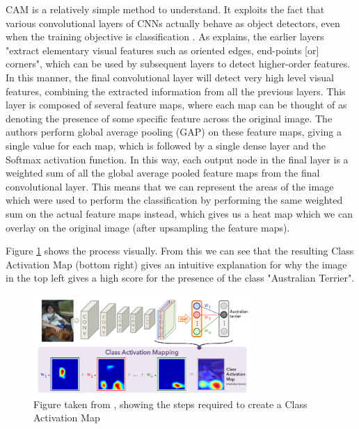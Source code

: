 \documentclass[conference]{IEEEtran}
\begin{document}
CAM is a relatively simple method to understand. It exploits the fact that various convolutional layers of CNNs actually behave as object detectors, even when the training objective is classification \cite{cam}. As \cite{lenet5} explains, the earlier layers "extract elementary visual features such as oriented edges, end-points [or] corners", which can be used by subsequent layers to detect higher-order features. In this manner, the final convolutional layer will detect very high level visual features, combining the extracted information from all the previous layers. This layer is composed of several feature maps, where each map can be thought of as denoting the presence of some specific feature across the original image. The authors perform global average pooling (GAP) on these feature maps, giving a single value for each map, which is followed by a single dense layer and the Softmax activation function. In this way, each output node in the final layer is a weighted sum of all the global average pooled feature maps from the final convolutional layer. This means that we can represent the areas of the image which were used to perform the classification by performing the same weighted sum on the actual feature maps instead, which gives us a heat map which we can overlay on the original image (after upsampling the feature maps).

Figure \ref{camimg} shows the process visually. From this we can see that the resulting Class Activation Map (bottom right) gives an intuitive explanation for why the image in the top left gives a high score for the presence of the class "Australian Terrier".

\begin{figure}[h]
\centerline{\includegraphics[width=3.25in]{figure/cam.png}}
\caption{Figure taken from \cite{cam}, showing the steps required to create a Class Activation Map}
\label{camimg}
\end{figure}
\end{document}
